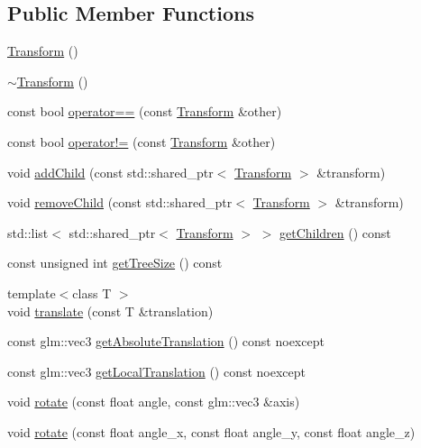 \subsection*{Public Member Functions}
\begin{DoxyCompactItemize}
\item 
\hyperlink{class_transform_aa08ca4266efabc768973cdeea51945ab}{Transform} ()
\item 
\hyperlink{class_transform_aa72e286c069850db80927b0e6554cd3e}{$\sim$\+Transform} ()
\item 
const bool \hyperlink{class_transform_a0ab0fe030d715fff815fb5cd2fad3951}{operator==} (const \hyperlink{class_transform}{Transform} \&other)
\item 
const bool \hyperlink{class_transform_aae84653176af974b257e44c832692501}{operator!=} (const \hyperlink{class_transform}{Transform} \&other)
\item 
void \hyperlink{class_transform_a56a4cdc7936c2654fc56c66a53f4432f}{add\+Child} (const std\+::shared\+\_\+ptr$<$ \hyperlink{class_transform}{Transform} $>$ \&transform)
\item 
void \hyperlink{class_transform_a9b4c664919e485ae51e244e8e9eb548d}{remove\+Child} (const std\+::shared\+\_\+ptr$<$ \hyperlink{class_transform}{Transform} $>$ \&transform)
\item 
std\+::list$<$ std\+::shared\+\_\+ptr$<$ \hyperlink{class_transform}{Transform} $>$ $>$ \hyperlink{class_transform_a8a4dd635e2fa7e652af05f13f22fe72b}{get\+Children} () const 
\item 
const unsigned int \hyperlink{class_transform_a4f9cf868bd8f7894ea28c4aae450cb69}{get\+Tree\+Size} () const 
\item 
{\footnotesize template$<$class T $>$ }\\void \hyperlink{class_transform_aafe00d06850ed594fcf0e44364f29224}{translate} (const T \&translation)
\item 
const glm\+::vec3 \hyperlink{class_transform_ad26386c52e4169a5f839a727c61e27a3}{get\+Absolute\+Translation} () const noexcept
\item 
const glm\+::vec3 \hyperlink{class_transform_a9abe479dcadead1d23c1335e8f042cea}{get\+Local\+Translation} () const noexcept
\item 
void \hyperlink{class_transform_a9b7f60043e6101b38888d9d760534626}{rotate} (const float angle, const glm\+::vec3 \&axis)
\item 
void \hyperlink{class_transform_a8f20b2aafd83175cb49eee9a14e55513}{rotate} (const float angle\+\_\+x, const float angle\+\_\+y, const float angle\+\_\+z)

\end{DoxyCompactItemize}
